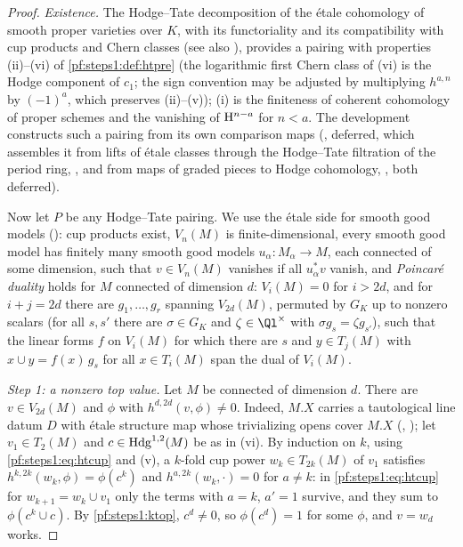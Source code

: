 \begin{proof}
\emph{Existence.} The Hodge--Tate decomposition of the \'etale cohomology of smooth proper varieties over $K$, with its
functoriality and its compatibility with cup products and Chern classes \cite{Faltings1988} (see also
\cite{Scholze2013phodge}), provides a pairing with properties (ii)--(vi) of \cref{pf:steps1:def:htpre} (the logarithmic
first Chern class of (vi) is the Hodge component of $c_1$; the sign convention may be adjusted by multiplying $h^{a,n}$ by
$(-1)^a$, which preserves (ii)--(v)); (i) is the finiteness of coherent cohomology of proper schemes and the vanishing of
$\mathrm{H}^{n-a}$ for $n<a$. The development constructs such a pairing from its own comparison maps
(, deferred, which assembles it from lifts of \'etale classes through
the Hodge--Tate filtration of the period ring, , and from maps of graded
pieces to Hodge cohomology, , both deferred).

Now let $P$ be any Hodge--Tate pairing. We use the \'etale side for smooth good models
(): cup products exist, $V_n(M)$ is finite-dimensional, every smooth good model has
finitely many smooth good models $u_\alpha\colon M_\alpha\to M$, each connected of some dimension, such that
$v\in V_n(M)$ vanishes if all $u_\alpha^*v$ vanish, and \emph{Poincar\'e duality} holds for $M$ connected of dimension $d$:
$V_i(M)=0$ for $i>2d$, and for $i+j=2d$ there are $g_1,\dots,g_r$ spanning $V_{2d}(M)$, permuted by $G_K$ up to nonzero
scalars (for all $s,s'$ there are $\sigma\in G_K$ and $\zeta\in\Ql^\times$ with $\sigma g_s=\zeta g_{s'}$), such that the
linear forms $f$ on $V_i(M)$ for which there are $s$ and $y\in T_j(M)$ with $x\cup y=f(x)\,g_s$ for all $x\in T_i(M)$ span
the dual of $V_i(M)$.

\emph{Step 1: a nonzero top value.} Let $M$ be connected of dimension $d$. There are $v\in V_{2d}(M)$ and $\phi$ with
$h^{d,2d}(v,\phi)\ne0$. Indeed, $M.X$ carries a tautological line datum $D$ with \'etale structure map whose trivializing opens
cover $M.X$ (,
); let $v_1\in T_2(M)$ and $c\in\mathrm{Hdg}^{1,2}(M)$ be as in (vi).
By induction on $k$, using \eqref{pf:steps1:eq:htcup} and (v), a $k$-fold cup power $w_k\in T_{2k}(M)$ of $v_1$ satisfies
$h^{k,2k}(w_k,\phi)=\phi(c^k)$ and $h^{a,2k}(w_k,\cdot)=0$ for $a\ne k$: in \eqref{pf:steps1:eq:htcup} for $w_{k+1}=w_k\cup v_1$ only
the terms with $a=k$, $a'=1$ survive, and they sum to $\phi(c^k\cup c)$. By \cref{pf:steps1:ktop}, $c^d\ne0$, so
$\phi(c^d)=1$ for some $\phi$, and $v=w_d$ works.


\end{proof}

